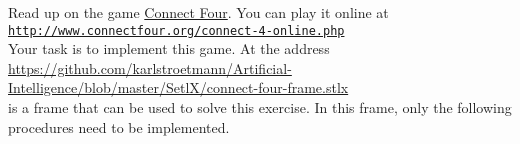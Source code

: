 \exercise
Read up on the game \href{https://en.wikipedia.org/wiki/Connect_Four}{Connect Four}.  You can play it online at
\\[0.2cm]
\hspace*{1.3cm}
\href{http://www.connectfour.org/connect-4-online.php}{\texttt{http://www.connectfour.org/connect-4-online.php}}
\\[0.2cm]
Your task is to implement this game.  At the address
\\[0.2cm]
\hspace*{1.3cm}
\href{https://github.com/karlstroetmann/Artificial-Intelligence/blob/master/SetlX/connect-four-frame.stlx}{https://github.com/karlstroetmann/Artificial-Intelligence/blob/master/SetlX/connect-four-frame.stlx}
\\[0.2cm]
is a frame that can be used to solve this exercise.  In this frame, only the following procedures need to be
implemented. 
